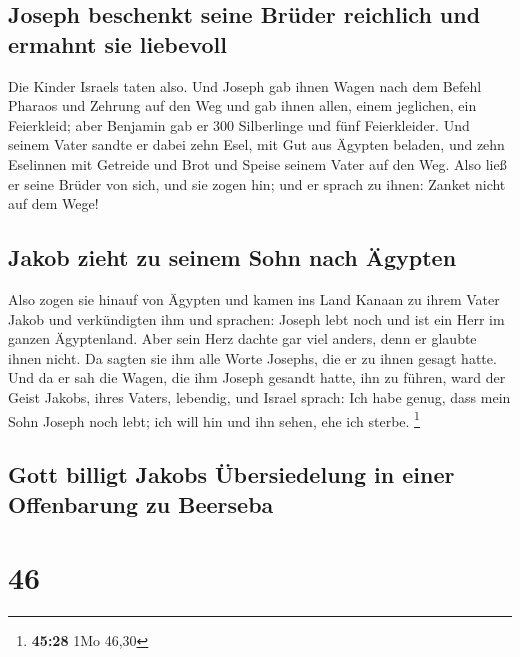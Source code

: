 \hypertarget{joseph-beschenkt-seine-bruxfcder-reichlich-und-ermahnt-sie-liebevoll}{%
\subsection{Joseph beschenkt seine Brüder reichlich und ermahnt sie
liebevoll}\label{joseph-beschenkt-seine-bruxfcder-reichlich-und-ermahnt-sie-liebevoll}}

 Die Kinder Israels taten also. Und Joseph gab ihnen
Wagen nach dem Befehl Pharaos und Zehrung auf den Weg 
und gab ihnen allen, einem jeglichen, ein Feierkleid; aber Benjamin gab
er 300 Silberlinge und fünf Feierkleider.  Und seinem
Vater sandte er dabei zehn Esel, mit Gut aus Ägypten beladen, und zehn
Eselinnen mit Getreide und Brot und Speise seinem Vater auf den Weg.
 Also ließ er seine Brüder von sich, und sie zogen hin;
und er sprach zu ihnen: Zanket nicht auf dem Wege!

\hypertarget{jakob-zieht-zu-seinem-sohn-nach-uxe4gypten}{%
\subsection{Jakob zieht zu seinem Sohn nach
Ägypten}\label{jakob-zieht-zu-seinem-sohn-nach-uxe4gypten}}

 Also zogen sie hinauf von Ägypten und kamen ins Land
Kanaan zu ihrem Vater Jakob  und verkündigten ihm und
sprachen: Joseph lebt noch und ist ein Herr im ganzen Ägyptenland. Aber
sein Herz dachte gar viel anders, denn er glaubte ihnen nicht.
 Da sagten sie ihm alle Worte Josephs, die er zu ihnen
gesagt hatte. Und da er sah die Wagen, die ihm Joseph gesandt hatte, ihn
zu führen, ward der Geist Jakobs, ihres Vaters, lebendig,
 und Israel sprach: Ich habe genug, dass mein Sohn Joseph
noch lebt; ich will hin und ihn sehen, ehe ich sterbe. \footnote{\textbf{45:28}
  1Mo 46,30}

\hypertarget{gott-billigt-jakobs-uxfcbersiedelung-in-einer-offenbarung-zu-beerseba}{%
\subsection{Gott billigt Jakobs Übersiedelung in einer Offenbarung zu
Beerseba}\label{gott-billigt-jakobs-uxfcbersiedelung-in-einer-offenbarung-zu-beerseba}}

\hypertarget{section-45}{%
\section{46}\label{section-45}}

